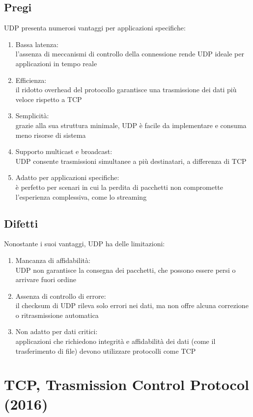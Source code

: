 \documentclass[10pt,oneside,a4paper]{article}
\begin{document}
\subsection{Pregi}
UDP presenta numerosi vantaggi per applicazioni specifiche:
\begin{enumerate}
\item Bassa latenza:\\
l'assenza di meccanismi di controllo della connessione rende UDP ideale per applicazioni in tempo reale
\item Efficienza:\\
il ridotto overhead del protocollo garantisce una trasmissione dei dati più veloce rispetto a TCP
\item Semplicità:\\
grazie alla sua struttura minimale, UDP è facile da implementare e consuma meno risorse di sistema
\item Supporto multicast e broadcast:\\
UDP consente trasmissioni simultanee a più destinatari, a differenza di TCP
\item Adatto per applicazioni specifiche:\\
è perfetto per scenari in cui la perdita di pacchetti non compromette l'esperienza complessiva, come lo streaming
\end{enumerate}
\subsection{Difetti}
Nonostante i suoi vantaggi, UDP ha delle limitazioni:
\begin{enumerate}
\item Mancanza di affidabilità:\\
UDP non garantisce la consegna dei pacchetti, che possono essere persi o arrivare fuori ordine
\item Assenza di controllo di errore:\\
il checksum di UDP rileva solo errori nei dati, ma non offre alcuna correzione o ritrasmissione automatica
\item Non adatto per dati critici:\\
applicazioni che richiedono integrità e affidabilità dei dati (come il trasferimento di file) devono utilizzare protocolli come TCP
\end{enumerate}
\section{TCP, Trasmission Control Protocol (2016)}
\end{document}
